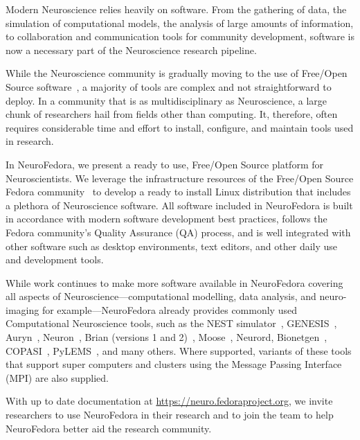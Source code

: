 
Modern Neuroscience relies heavily on software.
From the gathering of data, the simulation of computational models, the analysis of large amounts of information, to collaboration and communication tools for community development, software is now a necessary part of the Neuroscience research pipeline.

While the Neuroscience community is gradually moving to the use of Free/Open Source software~\cite{Stallman2002,Gleeson2017}, a majority of tools are complex and not straightforward to deploy.
In a community that is as multidisciplinary as Neuroscience, a large chunk of researchers hail from fields other than computing.
It, therefore, often requires considerable time and effort to install, configure, and maintain tools used in research.

In NeuroFedora, we present a ready to use, Free/Open Source platform for Neuroscientists.
We leverage the infrastructure resources of the Free/Open Source Fedora community~\cite{RedHat2008} to develop a ready to install Linux distribution that includes a plethora of Neuroscience software.
All software included in NeuroFedora is built in accordance with modern software development best practices, follows the Fedora community's Quality Assurance (QA) process, and is well integrated with other software such as desktop environments, text editors, and other daily use and development tools.

While work continues to make more software available in NeuroFedora covering all aspects of Neuroscience---computational modelling, data analysis, and neuro-imaging for example---NeuroFedora already provides commonly used Computational Neuroscience tools, such as the NEST simulator~\cite{Linssen2018}, GENESIS~\cite{Bower2003}, Auryn~\cite{Zenke2014}, Neuron~\cite{Hines1997}, Brian (versions 1 and 2)~\cite{Goodman2009}, Moose~\cite{Dudani2009}, Neurord, Bionetgen~\cite{Harris2016}, COPASI~\cite{Mendes2009}, PyLEMS~\cite{Vella2014}, and many others.
Where supported, variants of these tools that support super computers and clusters using the Message Passing Interface (MPI) are also supplied.

With up to date documentation at \url{https://neuro.fedoraproject.org}, we invite researchers to use NeuroFedora in their research and to join the team to help NeuroFedora better aid the research community.
